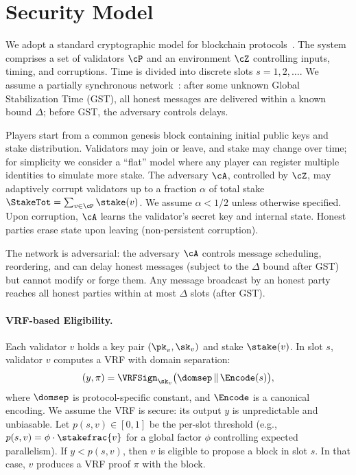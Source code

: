 



\section{Security Model}
\label{sec:model}

We adopt a standard cryptographic model for blockchain protocols~\cite{EC:GarKiaLeo15,EC:PasSeeShe17,JC:Canetti00}. The system comprises a set of validators $\cP$ and an environment $\cZ$ controlling inputs, timing, and corruptions. Time is divided into discrete slots $s=1,2,\ldots$. We assume a partially synchronous network~\cite{DLS88,EC:PasSeeShe17}: after some unknown Global Stabilization Time (GST), all honest messages are delivered within a known bound $\Delta$; before GST, the adversary controls delays. 

Players start from a common genesis block containing initial public keys and stake distribution. Validators may join or leave, and stake may change over time; for simplicity we consider a “flat” model where any player can register multiple identities to simulate more stake. The adversary $\cA$, controlled by $\cZ$, may adaptively corrupt validators up to a fraction $\alpha$ of total stake $\StakeTot=\sum_{v\in\cP}\stake(v)$. We assume $\alpha < 1/2$ unless otherwise specified. Upon corruption, $\cA$ learns the validator's secret key and internal state. Honest parties erase state upon leaving (non-persistent corruption).

The network is adversarial: the adversary $\cA$ controls message scheduling, reordering, and can delay honest messages (subject to the $\Delta$ bound after GST) but cannot modify or forge them. Any message broadcast by an honest party reaches all honest parties within at most $\Delta$ slots (after GST). 

\paragraph{VRF-based Eligibility.} Each validator $v$ holds a key pair $(\pk_v,\sk_v)$ and stake $\stake(v)$. In slot $s$, validator $v$ computes a VRF with domain separation:
\begin{equation*}
(y,\pi) = \VRFSign_{\sk_v}\bigl(\domsep \,\|\,\Encode(s)\bigr),
\end{equation*}
where $\domsep$ is protocol-specific constant, and $\Encode$ is a canonical encoding. We assume the VRF is secure: its output $y$ is unpredictable and unbiasable. Let $p(s,v)\in[0,1]$ be the per-slot threshold (e.g., $p(s,v) = \phi\cdot \stakefrac{v}$ for a global factor $\phi$ controlling expected parallelism). If $y < p(s,v)$, then $v$ is eligible to propose a block in slot $s$. In that case, $v$ produces a VRF proof $\pi$ with the block.

